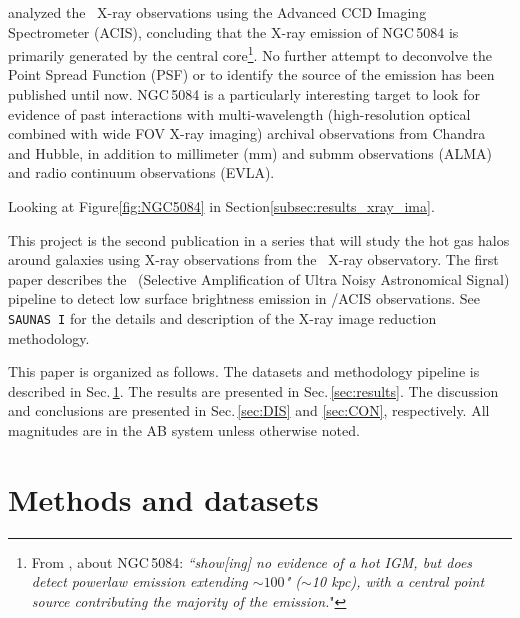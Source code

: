 \documentclass[modern]{aastex631}
\begin{document}
\citet{osullivan+2017mnras472_1482} analyzed the \Chandra\ X-ray observations using the Advanced CCD Imaging Spectrometer (ACIS), concluding that the X-ray emission of NGC\,5084 is primarily generated by the central core\footnote{From \citet{osullivan+2017mnras472_1482}, about NGC\,5084: \emph{``show[ing] no evidence of a hot IGM, but does detect powerlaw emission extending $\sim100$" ($\sim$10 kpc), with a central point
source contributing the majority of the emission.}"}. No further attempt to deconvolve the Point Spread Function (PSF) or to identify the source of the emission has been published until now.  NGC\,5084 is a particularly interesting target to look for evidence of past interactions with multi-wavelength (high-resolution optical combined with wide FOV X-ray imaging) archival observations from Chandra and Hubble, in addition to millimeter (mm) and submm observations (ALMA) and radio continuum observations (EVLA). 

Looking at Figure\ref{fig:NGC5084} in Section\ref{subsec:results_xray_ima}. 

This project is the second publication in a series that will study the hot gas halos around galaxies using X-ray observations from the \Chandra\ X-ray observatory. The first paper \citep[first thing][\texttt{SAUNAS I}, hereafter]{borlaff+2024apj967_169} describes the \SAUNAS\ (Selective Amplification of Ultra Noisy Astronomical Signal) pipeline to detect low surface brightness emission in \Chandra/ACIS observations. See \texttt{SAUNAS I} for the details and description of the X-ray image reduction methodology.

This paper is organized as follows. The datasets and methodology pipeline is described in Sec.\,\ref{sec:methods}. The results are presented in Sec.\,\ref{sec:results}. The discussion and conclusions are presented in Sec.\,\ref{sec:DIS} and \ref{sec:CON}, respectively. All magnitudes are in the AB system \citep{oke1971apj170_193} unless otherwise noted.

\section{Methods and datasets} 
\label{sec:methods}
\end{document}

